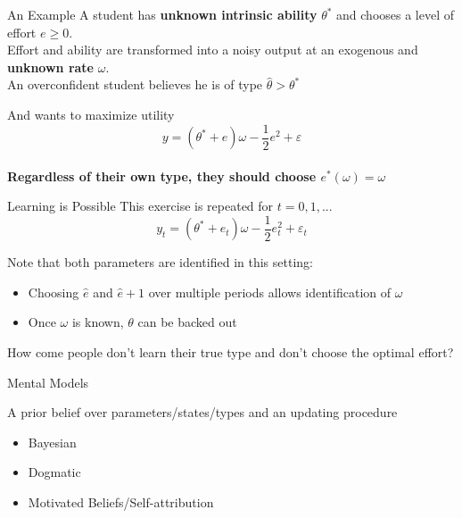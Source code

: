 \documentclass[aspectratio=169]{beamer}
\begin{document}
\begin{frame}{An Example}
    A student has \textbf{unknown intrinsic ability} $\theta^*$ and chooses a level of effort $e\geq 0$. \\
    \bigskip
    Effort and ability are transformed into a noisy output at an exogenous and \textbf{unknown rate} $\omega.$\\
    \bigskip 
    An overconfident student believes he is of type $\hat\theta>\theta^*$\\
    \bigskip
    
    And wants to maximize utility\\
        $$y = (\theta^* + e)\omega-\frac{1}{2}e^2 +\varepsilon$$\\
    \pause
    \bigskip
   {\textbf{Regardless of their own type, they should choose $e^*(\omega)=\omega$\\}}
\end{frame}

\begin{frame}{Learning is Possible}
    This exercise is repeated for $t=0, 1, ...$
        $$y_t = (\theta^* + e_t)\omega-\frac{1}{2}e_t^2 +\varepsilon_t$$
    
    Note that both parameters are identified in this setting:\\
    \bigskip
    
    \begin{itemize}
        \item Choosing $\hat{e}$ and $\hat{e}+1$ over multiple periods allows identification of $\omega$\\
        \bigskip
        \item Once $\omega$ is known, $\theta$ can be backed out\\
     \end{itemize}
    \bigskip
    How come people don't learn their true type and don't choose the optimal effort?
\end{frame}

\begin{frame}{Mental Models}

A prior belief over parameters/states/types and an updating procedure\\
\bigskip
\begin{itemize}
    \item Bayesian 
    \item Dogmatic 
    \item Motivated Beliefs/Self-attribution
\end{itemize}
\end{frame}
\end{document}
